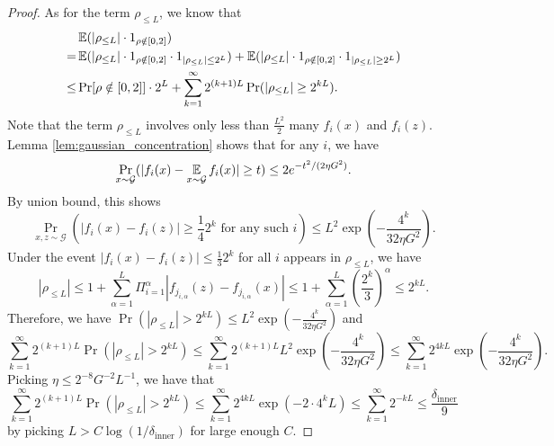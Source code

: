 \begin{proof}
As for the term $\rho_{\leq L}$, we know that
\begin{align}
\label{eq:split_dTVterm}
& \operatorname*{\mathbb{E}}(|\rho_{\leq L}|\cdot 1_{\rho \notin [0,2]})\nonumber\\
= & \operatorname*{\mathbb{E}}(|\rho_{\leq L}|\cdot 1_{\rho \notin [0,2]}\cdot 1_{|\rho_{\leq L}|\leq 2^L})+\operatorname*{\mathbb{E}}(|\rho_{\leq L}|\cdot1_{\rho \notin [0,2]}\cdot 1_{|\rho_{\leq L}|\geq 2^L})\nonumber \\
\leq & \Pr[\rho\notin[0,2]]\cdot 2^L+ \sum_{k=1}^{\infty}2^{(k+1)L}\Pr(|\rho_{\leq L}|\ge2^{kL}).
\end{align}
Note that the term $\rho_{\leq L}$ involves only less than $\frac{L^{2}}{2}$
many $f_{i}(x)$ and $f_{i}(z)$. Lemma \ref{lem:gaussian_concentration}
shows that for any $i$, we have
\[
\Pr_{x\sim\mathcal{G}}(|f_{i}(x)-\operatorname*{\mathbb{E}}_{x\sim\mathcal{G}}f_{i}(x)|\geq t )\leq2e^{-t^{2}/(2 \eta G^2)}.
\]
By union bound, this shows 
\[
\Pr_{x,z\sim\mathcal{G}}(|f_{i}(x)-f_{i}(z)|\geq\frac{1}{4}2^{k}\text{ for any such }i)\leq L^{2}\exp(-\frac{4^{k}}{32\eta G^{2}}).
\]
Under the event $|f_{i}(x)-f_{i}(z)|\leq\frac{1}{3}2^{k}$
for all $i$ appears in $\rho_{\leq L}$, we have
\[
|\rho_{\leq L}|\leq1+\sum_{\alpha=1}^{L}\Pi_{i=1}^{\alpha}|f_{j_{i,\alpha}}(z)-f_{j_{i,\alpha}}(x)|\leq1+\sum_{\alpha=1}^{L}(\frac{2^{k}}{3})^\alpha\leq2^{kL}.
\]
Therefore, we have $\Pr(|\rho_{\leq L}|>2^{kL})\leq L^{2}\exp(-\frac{4^{k}}{32\eta G^{2}})$
and
\[
\sum_{k=1}^{\infty}2^{(k+1)L}\Pr(|\rho_{\leq L}|>2^{kL})\leq\sum_{k=1}^{\infty}2^{(k+1)L}L^{2}\exp(-\frac{4^{k}}{32\eta G^{2}})\leq\sum_{k=1}^{\infty}2^{4kL}\exp(-\frac{4^{k}}{32\eta G^{2}}).
\]
Picking $\eta\leq2^{-8}G^{-2}L^{-1}$, we have that
\begin{equation}
\sum_{k=1}^{\infty}2^{(k+1)L}\Pr(|\rho_{\leq L}|>2^{kL})\leq\sum_{k=1}^{\infty}2^{4kL}\exp(-2\cdot4^{k}L)\leq\sum_{k=1}^{\infty}2^{-kL}\leq\frac{\delta_{\mathrm{inner}}}{9}\label{eq:dTV4}
\end{equation}
by picking $L>C\log(1/\delta_{\mathrm{inner}})$ for large enough
$C$.


\end{proof}
